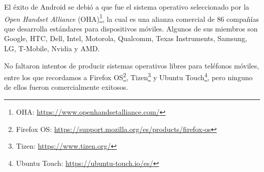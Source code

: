 El éxito de Android se debió a que fue el sistema operativo seleccionado por la \emph{Open Handset Alliance} (OHA)\footnote{OHA: \url{https://www.openhandsetalliance.com/}}, la cual es una alianza comercial de 86 compañías que desarrolla estándares para dispositivos móviles. Algunos de sus miembros son Google, HTC, Dell, Intel, Motorola, Qualcomm, Texas Instruments, Samsung, LG, T-Mobile, Nvidia y AMD.


No faltaron intentos de producir sistemas operativos libres para teléfonos móviles, entre los que recordamos a Firefox OS\footnote{Firefox OS: \url{https://support.mozilla.org/es/products/firefox-os}}, Tizen\footnote{Tizen: \url{https://www.tizen.org/}} y Ubuntu Touch\footnote{Ubuntu Touch: \url{https://ubuntu-touch.io/es/}}, pero ninguno de ellos fueron comercialmente exitosos.


